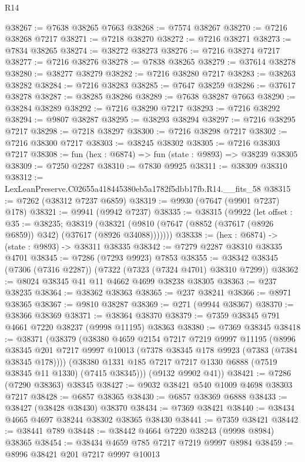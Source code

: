 \begin{lexlean}{R14}
\begin{coremodule}
@38267 := @7638 @38265 @7663
@38268 := @7574 @38267
@38270 := @7216 @38268 @7217
@38271 := @7218 @38270
@38272 := @7216 @38271
@38273 := @7834 @38265
@38274 := @38272 @38273
@38276 := @7216 @38274 @7217
@38277 := @7216 @38276
@38278 := @7838 @38265
@38279 := @37614 @38278
@38280 := @38277 @38279
@38282 := @7216 @38280 @7217
@38283 := @38263 @38282
@38284 := @7216 @38283
@38285 := @7647 @38259
@38286 := @37617 @38278
@38287 := @38285 @38286
@38289 := @7638 @38287 @7663
@38290 := @38284 @38289
@38292 := @7216 @38290 @7217
@38293 := @7216 @38292
@38294 := @9807 @38287
@38295 := @38293 @38294
@38297 := @7216 @38295 @7217
@38298 := @7218 @38297
@38300 := @7216 @38298 @7217
@38302 := @7216 @38300 @7217
@38303 := @38245 @38302
@38305 := @7216 @38303 @7217
@38308 := fun (hex : @6874) => fun (state : @9893) => @38239 @38305
@38309 := @7250 @2287
@38310 := @7830 @9925
@38311 := @38309 @38310
@38312 := LexLeanPreserve.C02655a418445380eb5a1782f5dbb17fb.R14.__fits_58
@38315 := @7262 (@38312 @7237 @6859)
@38319 := @9930 (@7647 (@9901 @7237) @178)
@38321 := @9941 (@9942 @7237)
@38335 := @38315
    (@9922
      (let offset : @35 := @38235;
      @38319 (@38321 (@9810 (@7647 (@8852 (@37617 (@8926 @6859)) @342) (@37617 (@8926 @34088)))))))
@38338 := (hex : @6874) -> (state : @9893) -> @38311 @38335
@38342 := @7279 @2287 @38310 @38335 @4701
@38345 := @7286 (@7293 @9923) @7853
@38355 := @38342 @38345 (@7306 (@7316 @2287)) (@7322 (@7323 (@7324 @4701) @38310 @7299))
@38362 := @8024 @38345 @41 @11 @4662 @4699 @38238 @38305
@38363 := @237 @38235
@38364 := @38362 @38363
@38365 := @237 @38241
@38366 := @8971 @38365
@38367 := @9810 @38287
@38369 := @271 (@9944 @38367)
@38370 := @38366 @38369
@38371 := @38364 @38370
@38379 := @7359 @38345 @791 @4661 @7220 @38237 (@9998 @11195) @38363
@38380 := @7369 @38345
@38418 := @38371
    (@38379
      (@38380
        @4659
        @2154
        @7217
        @7219
        @9997
        @11195
        (@8996 @38345 @201 @7217 @9997 @10013 (@7378 @38345 @178 @9923 (@7383 (@7384 @38345 @178))))
        (@38380 @1331 @185 @7217 @7217 @1330 @6888 (@7519 @38345 @11 @1330) (@7415 @38345)))
      (@9132 @9902 @41))
@38421 := @7286 (@7290 @38363) @38345
@38427 := @9032 @38421 @540 @1009 @4698 @38303 @7217
@38428 := @6857 @38365
@38430 := @6857 @38369 @6888
@38433 := @38427 (@38428 @38430) @38370
@38434 := @7369 @38421
@38440 := @38434 @4665 @4697 @38244 @38302 @38365 @38430
@38441 := @7359 @38421
@38442 := @38441 @789
@38448 := @38442 @4664 @7220 @38243 (@9998 @8984) @38365
@38454 := @38434 @4659 @785 @7217 @7219 @9997 @8984
@38459 := @8996 @38421 @201 @7217 @9997 @10013

\end{coremodule}
\end{lexlean}

